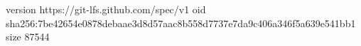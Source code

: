 version https://git-lfs.github.com/spec/v1
oid sha256:7be42654e0878debaae3d8d57aac8b558d7737e7da9c406a346f5a639e541bb1
size 87544
